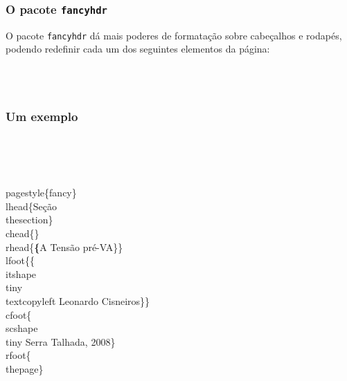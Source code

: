 \documentclass{beamer}
\newcommand{\pacote}[1]{\texttt{\textcolor[rgb]{0.3,0.6,0}{#1}}}
\newenvironment{fblock}{\vspace{8pt}\begin{boxedminipage}{\textwidth}}{\end{boxedminipage}\vspace{8pt}}
\begin{document}
\begin{frame}[fragile]
\frametitle{O pacote \texttt{fancyhdr}}

O pacote \pacote{fancyhdr} dá mais poderes de formatação sobre cabeçalhos e rodapés, podendo redefinir cada um dos seguintes elementos da página:

\begin{center}
\begin{fblock}
\noindent{}
\noindent\makebox[\textwidth]{\hrulefill}\\[\baselineskip]
\noindent{}\\[\baselineskip]
\noindent\makebox[\textwidth]{\hrulefill}
\noindent{}
\end{fblock}

\end{center}
\end{frame}

\begin{frame}[fragile]
\frametitle{Um exemplo}
\begin{small}
\begin{flushleft}
\begin{fblock}
\noindent{}
\noindent\makebox[\textwidth]{\hrulefill}\\[\baselineskip]
\noindent{}\\[\baselineskip]
\noindent\makebox[\textwidth]{\hrulefill}
\noindent{}
\end{fblock}
\end{flushleft}
\end{small}

\begin{footnotesize}
\begin{semiverbatim}
\\pagestyle\{fancy\}
\alert<2>{\\lhead\{Seção \\thesection\}}
\\chead\{\}
\alert<3>{\\rhead\{\textbf\{A Tensão pré-VA\}\}}
\alert<4>{\\lfoot\{\{\\itshape \\tiny \\textcopyleft Leonardo Cisneiros\}\}}
\alert<5>{\\cfoot\{\\scshape \\tiny Serra Talhada, 2008\}}
\alert<6>{\\rfoot\{\\thepage\}}
\end{semiverbatim}
\end{footnotesize}

\end{frame}
\end{document}
